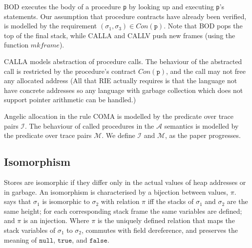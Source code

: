\documentclass[runningheads,a4paper]{llncs}
\newcommand*{\nullv}{\texttt{null}}
\newcommand*{\truev}{\texttt{true}}
\newcommand*{\falsev}{\texttt{false}}
\newcommand*{\Contract}{\mathit{Con}}
\newcommand*\Asemantics{\mathcal{A}}
\newcommand*\asemantics{$\Asemantics$ semantics}
\newcommand*{\callRuleAbstract}{\textnormal{CALLA}}
\newcommand*{\composeRuleAbstract}{\textnormal{COMA}}
\newcommand*{\callRuleConcrete}{\textnormal{CALLV}}
\newcommand*{\callRuleVerified}{\callRuleConcrete{}}
\newcommand*{\bodyRule}{\textnormal{BOD}}
\newcommand*{\fun}{\texttt{p}}
\newcommand*{\mkframe}{\mathit{mkframe}}
\newcommand*{\isoR}{\mathcal{I}}
\newcommand*{\mutR}{\mathcal{M}}
\newcommand*{\store}{\sigma}
\begin{document}
\bodyRule{} executes the body of a procedure \texttt{\fun} by looking up and executing \texttt{\fun}'s statements. Our assumption that procedure contracts have already been verified, is modelled by the requirement $(\store_1,\store_3) \in \Contract(\fun)$. Note that \bodyRule{} pops the top of the final stack, while \callRuleAbstract{} and \callRuleVerified{} push new frames (using the function $\mkframe$).

\callRuleAbstract{} models abstraction of procedure calls. The behaviour of the abstracted call is restricted by the procedure's contract $\Contract(\fun)$, and the call may not free any allocated address (All that RIE actually requires is that the language not have concrete addresses so any language with garbage collection which does not support pointer arithmetic can be handled.)

Angelic allocation in the rule \composeRuleAbstract{} is modelled by the predicate over trace pairs $\isoR$. The behaviour of called procedures in the \asemantics{} is modelled by the predicate over trace pairs $\mutR$. We define $\isoR$ and $\mutR$, as the paper progresses.

\subsection{Isomorphism}

Stores are isomorphic if they differ only in the actual values of heap addresses or in garbage. An isomorphism is characterised by a bijection between values, $\pi$.  says that $\store_1$ is isomorphic to $\store_2$ with relation $\pi$ iff the stacks of $\store_1$ and $\store_2$ are the same height; for each corresponding stack frame the same variables are defined; and $\pi$ is an injection. Where $\pi$ is the uniquely defined relation that maps the stack variables of $\store_1$ to $\store_2$, commutes with field dereference, and preserves the meaning of $\nullv$, $\truev$, and $\falsev$.
\end{document}
